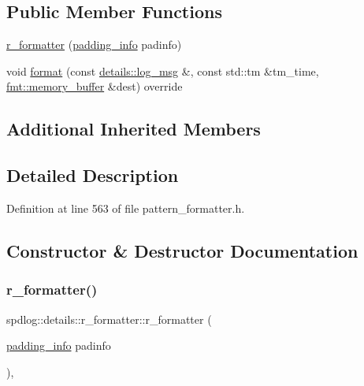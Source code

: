 \subsection*{Public Member Functions}
\begin{DoxyCompactItemize}
\item 
\hyperlink{classspdlog_1_1details_1_1r__formatter_ac3be2e36215d0335d859af35a35e2810}{r\+\_\+formatter} (\hyperlink{structspdlog_1_1details_1_1padding__info}{padding\+\_\+info} padinfo)
\item 
void \hyperlink{classspdlog_1_1details_1_1r__formatter_a5d4a5d4f5f1285c4a4af104a775e9859}{format} (const \hyperlink{structspdlog_1_1details_1_1log__msg}{details\+::log\+\_\+msg} \&, const std\+::tm \&tm\+\_\+time, \hyperlink{format_8h_a21cbf729f69302f578e6db21c5e9e0d2}{fmt\+::memory\+\_\+buffer} \&dest) override
\end{DoxyCompactItemize}
\subsection*{Additional Inherited Members}


\subsection{Detailed Description}


Definition at line 563 of file pattern\+\_\+formatter.\+h.



\subsection{Constructor \& Destructor Documentation}
\mbox{\label{classspdlog_1_1details_1_1r__formatter_ac3be2e36215d0335d859af35a35e2810}} 
\subsubsection{\texorpdfstring{r\+\_\+formatter()}{r\_formatter()}}
{\footnotesize\ttfamily spdlog\+::details\+::r\+\_\+formatter\+::r\+\_\+formatter (\begin{DoxyParamCaption}\item[{\hyperlink{structspdlog_1_1details_1_1padding__info}{padding\+\_\+info}}]{padinfo }\end{DoxyParamCaption})\hspace{0.3cm}{\ttfamily [inline]}, {\ttfamily [explicit]}}



